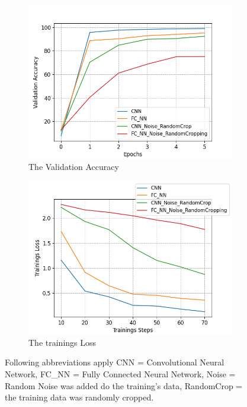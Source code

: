 \begin{figure}[h]
    \begin{subfigure}[b]{0.5\textwidth}
        \includegraphics[width=\textwidth]{figures/val_acc_result_data.png}
        \caption{The Validation Accuracy}
    \end{subfigure}
     \begin{subfigure}[b]{0.5\textwidth}
        \includegraphics[width=\textwidth]{figures/train_loss_accumulated_result_data.png}
        \caption{The trainings Loss}
    \end{subfigure}
    \caption{Following abbreviations apply CNN = Convolutional Neural Network, FC\_NN = Fully Connected Neural Network, Noise = Random Noise was added do the training's data, RandomCrop = the training data was randomly cropped.}
    \label{fig:results}
\end{figure}


